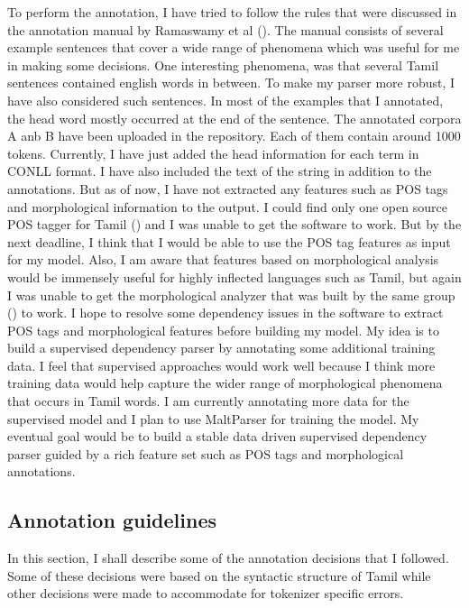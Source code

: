 \documentclass[11pt,letterpaper]{article}
\begin{document}
To perform the annotation, I have tried to follow the rules that were discussed in the annotation manual by Ramaswamy et al (\cite{ramReport}).
The manual consists of several example sentences that cover a wide range of phenomena which was useful for me in making
some decisions. One interesting phenomena, was that several Tamil sentences contained english words in between. To make my parser more robust,
I have also considered such sentences. In most of the examples that I annotated, the head word mostly occurred at the end of the sentence. The annotated corpora A anb B have been uploaded in the repository. Each of them contain around 1000 tokens. Currently, I have just added the head information for each term
in CONLL format. I have also included the text of the string in addition to the annotations. But as of now, I have not extracted any features such as 
POS tags and morphological information to the output. I could find only one open source POS tagger for Tamil (\cite{dhanalakshmi2010natural}) and I was unable to get the software
to work. But by the next deadline, I think that I would be able to use the POS tag features as input for my model. Also, I am aware that features based
on morphological analysis would be immensely useful for highly inflected languages such as Tamil, but again I was unable to get the morphological 
analyzer that was built by the same group (\cite{dhanalakshmi2010natural}) to work. I hope to resolve some dependency issues in the software to extract
POS tags and morphological features before building my model. My idea is to build a supervised dependency parser by annotating some additional training data. 
I feel that supervised approaches would work well because I think more training data would help capture the wider range of morphological phenomena that occurs in Tamil words. 
I am currently annotating more data for the supervised model and I plan to use MaltParser for training the model. My eventual goal would be
to build a stable data driven supervised dependency parser guided by a rich feature set such as POS tags and morphological annotations. 

\subsection{Annotation guidelines}

In this section, I shall describe some of the annotation decisions that I followed. Some of these decisions were based on the syntactic structure of Tamil while 
other decisions were made to accommodate for tokenizer specific errors.
\end{document}

